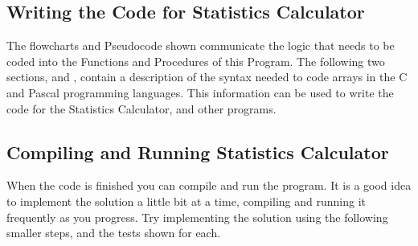 

\subsection{Writing the Code for Statistics Calculator} %
\label{sub:writing_the_code_for_statistics_calculator}

The flowcharts and Pseudocode shown communicate the logic that needs to be coded into the Functions and Procedures of this Program. The following two sections,   and   , contain a description of the syntax needed to code arrays in the C and Pascal programming languages. This information can be used to write the code for the Statistics Calculator, and other programs.

\clearpage
\subsection{Compiling and Running Statistics Calculator} %
\label{sub:compiling_and_running_statistics_calculator}

When the code is finished you can compile and run the program. It is a good idea to implement the solution a little bit at a time, compiling and running it frequently as you progress. Try implementing the solution using the following smaller steps, and the tests shown for each.

